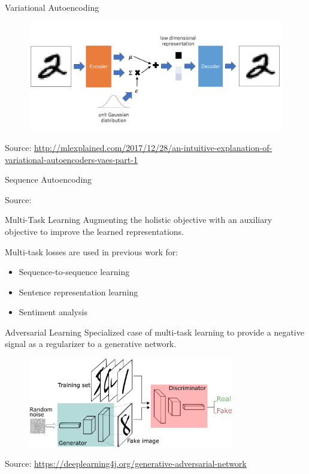 \documentclass[aspectratio=169]{beamer}
\newcommand{\imgsrc}[1]{\tiny{Source: #1}}
\begin{document}
\begin{frame}{Variational Autoencoding}
	\centering
	\begin{figure}[ht]
		\includegraphics[width=\linewidth]{vae-structure}
	\end{figure}
	\imgsrc{\url{http://mlexplained.com/2017/12/28/an-intuitive-explanation-of-variational-autoencoders-vaes-part-1}}
\end{frame}

\begin{frame}{Sequence Autoencoding}
	\centering
	\begin{figure}[ht]
		
	\end{figure}
	\imgsrc{\citet{srivastava2015unsupervised}}
\end{frame}

\begin{frame}{Multi-Task Learning}
	Augmenting the holistic objective with an auxiliary objective to improve the learned representations.

	Multi-task losses are used in previous work for:
	\begin{itemize}
		\item Sequence-to-sequence learning \citep{luong2015multi}
		\item Sentence representation learning \citep{jernite2017discourse}
		\item Sentiment analysis \citep{balikas2017multitask}
	\end{itemize}
\end{frame}

\begin{frame}{Adversarial Learning}
	Specialized case of multi-task learning to provide a negative signal as a regularizer to a generative network.

	\centering
	\begin{figure}[ht]
		\includegraphics[width=0.8\textwidth]{images/gans}
	\end{figure}
	\imgsrc{\url{https://deeplearning4j.org/generative-adversarial-network}}
\end{frame}
\end{document}
